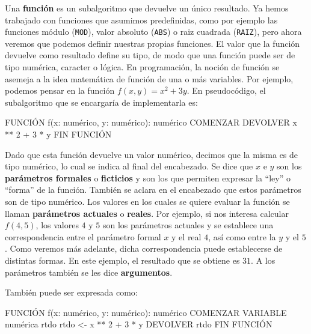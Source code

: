 \documentclass[
]{book}
\newenvironment{Shaded}{\begin{snugshade}}{\end{snugshade}}
\newcommand{\NormalTok}[1]{#1}
\begin{document}
Una \textbf{función} es un subalgoritmo que devuelve un único resultado. Ya hemos trabajado con funciones que asumimos predefinidas, como por ejemplo las funciones módulo (\texttt{MOD}), valor absoluto (\texttt{ABS}) o raiz cuadrada (\texttt{RAIZ}), pero ahora veremos que podemos definir nuestras propias funciones. El valor que la función devuelve como resultado define su tipo, de modo que una función puede ser de tipo numérica, caracter o lógica. En programación, la noción de función se asemeja a la idea matemática de función de una o más variables. Por ejemplo, podemos pensar en la función \(f(x, y) = x^2 + 3y\). En pseudocódigo, el subalgoritmo que se encargaría de implementarla es:

\begin{Shaded}
\begin{Highlighting}[]
\NormalTok{FUNCIÓN f(x: numérico, y: numérico): numérico}
\NormalTok{COMENZAR}
\NormalTok{    DEVOLVER x ** 2 + 3 * y}
\NormalTok{FIN FUNCIÓN}
\end{Highlighting}
\end{Shaded}

Dado que esta función devuelve un valor numérico, decimos que la misma es de tipo numérico, lo cual se indica al final del encabezado. Se dice que \(x\) e \(y\) son los \textbf{parámetros formales} o \textbf{ficticios} y son los que permiten expresar la ``ley'' o ``forma'' de la función. También se aclara en el encabezado que estos parámetros son de tipo numérico. Los valores en los cuales se quiere evaluar la función se llaman \textbf{parámetros actuales} o \textbf{reales}. Por ejemplo, si nos interesa calcular \(f(4, 5)\), los valores \(4\) y \(5\) son los parámetros actuales y se establece una correspondencia entre el parámetro formal \(x\) y el real \(4\), así como entre la \(y\) y el \(5\). Como veremos más adelante, dicha correspondencia puede establecerse de distintas formas. En este ejemplo, el resultado que se obtiene es \(31\). A los parámetros también se les dice \textbf{argumentos}.

También puede ser expresada como:

\begin{Shaded}
\begin{Highlighting}[]
\NormalTok{FUNCIÓN f(x: numérico, y: numérico): numérico}
\NormalTok{COMENZAR}
\NormalTok{    VARIABLE numérica rtdo}
\NormalTok{    rtdo \textless{}{-} x ** 2 + 3 * y}
\NormalTok{    DEVOLVER rtdo}
\NormalTok{FIN FUNCIÓN}
\end{Highlighting}
\end{Shaded}
\end{document}
